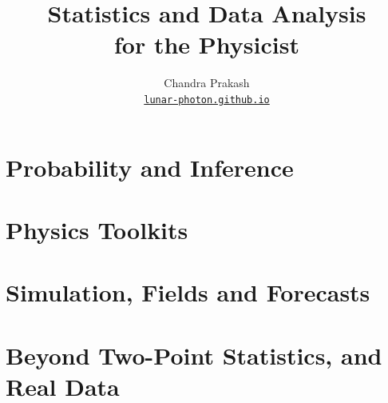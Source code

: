 \documentclass[11pt,openany]{book}
\title{\sffamily\bfseries\color{accent}\Huge Statistics and Data Analysis\\[10pt]
  \normalfont\sffamily\Large\color{black!70} for the Physicist}
\author{\large Chandra Prakash\\[0.6em]
  \normalsize\href{https://lunar-photon.github.io}{\texttt{lunar-photon.github.io}}}
\date{}
\begin{document}
\frontmatter
\maketitle

\tableofcontents
\mainmatter
\part{Probability and Inference}
\setcounter{chapter}{-1}

\renewcommand{\thechapter}{T\arabic{chapter}}\renewcommand{\theHchapter}{T\arabic{chapter}}
\setcounter{chapter}{-1}

\renewcommand{\thechapter}{\arabic{chapter}}\renewcommand{\theHchapter}{\arabic{chapter}}
\setcounter{chapter}{0}





\part{Physics Toolkits}
\renewcommand{\thechapter}{T\arabic{chapter}}\renewcommand{\theHchapter}{T\arabic{chapter}}
\setcounter{chapter}{0}





\part{Simulation, Fields and Forecasts}
\renewcommand{\thechapter}{\arabic{chapter}}\renewcommand{\theHchapter}{N\arabic{chapter}}
\setcounter{chapter}{5}






\part{Beyond Two-Point Statistics, and Real Data}
\setcounter{chapter}{11}



\backmatter
\printbibliography[heading=bibintoc]
\end{document}
